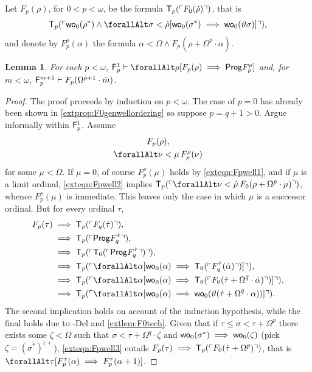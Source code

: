 \documentclass[UKenglish,cleveref,DIV=12]{scrartcl}
\let\forall\forallAlt
\newtheorem{lemma}{Lemma}
\theoremstyle{definition}
\theoremstyle{definition}
\begin{document}
Let $F_p(\rho)$, for $0<p<\omega$, be the formula $\mathsf{T}_p(\ulcorner{F_0(\dot\rho)}\urcorner)$, that is
\begin{align*}
 \T_{p}(\gn{\wo_0(\rho^*)\land\forall\sigma<\dot\rho [\wo_0(\sigma^*)\implies\wo_0(\vartheta\sigma)]}),
\end{align*}
and denote by $F_p^\rho(\alpha)$ the formula $\alpha<\Omega\land F_p(\rho+\Omega^{\bar p}\cdot\alpha)$.
\begin{lemma}\label{extlem:Fpwellordering1}
 For each $p<\omega$, $\F_p^1\proves \forall\rho[F_p(\rho)\implies\Prog F_p^{\rho}]$ and, for $m<\omega$, $\mathsf{F}_p^{m+1}\vdash F_p(\Omega^{\bar p+1}\cdot\bar m)$.
\end{lemma}
\begin{proof} The proof proceeds by induction on $p<\omega$. The case of $p=0$
has already been shown in \cref{extprop:F0genwellordering} so suppose $p=q+1>0$.
Argue informally within $\mathsf{F}_p^1$. Assume
\begin{gather}
 F_p(\rho),\label{exteqn:Fpwell1}\\
 \forall\nu<\mu\,F_p^\rho(\nu)\label{exteqn:Fpwell2}
\end{gather}
for some $\mu<\Omega$. If $\mu=0$, of course $F_p^\rho(\mu)$ holds by
\cref{exteqn:Fpwell1}, and if $\mu$ is a limit ordinal, \cref{exteqn:Fpwell2}
implies $\T_p(\gn{\forall\nu<\dot\mu\,F_0(\rho+\Omega^{\bar p}\cdot\mu)})$,
whence $F_p^\rho(\mu)$ is immediate. This leaves only the case in which $\mu$ is a
successor ordinal. But for every ordinal $\tau$,
\begin{align}\label{exteqn:Fpwell3}
\begin{split}
  F_p(\tau) &\implies \T_p(\gn{F_q(\dot\tau)}), \\
	  &\implies \T_p(\gn{\Prog F_q^{\dot\tau}}),\\
	  &\implies \T_p(\gn{\T_0(\gn{\Prog F_q^{\dot\tau}})}),\\
	  &\implies \T_p(\gn{\forall\alpha[\wo_0(\alpha)\implies \T_0(\gn{F_q^{\dot\tau}(\dot\alpha)})]}),\\
	  &\implies \T_p(\gn{\forall\alpha[\wo_0(\alpha)\implies \T_0(\gn{F_0(\dot\tau+\Omega^{\bar q}\cdot\dot\alpha)})]}),\\
	  &\implies \T_p(\gn{\forall\alpha[\wo_0(\alpha)\implies\wo_0(\vartheta(\dot\tau+\Omega^{\bar q}\cdot\alpha))]}).
	  \end{split}
\end{align}
The second implication holds on account of the induction hypothesis, while the
final holds due to -Del and \cref{extlem:F0tech}. Given that if
$\tau\le\sigma<\tau+\Omega^{p}$ there exists
some $\zeta<\Omega$ such that $\sigma<\tau+\Omega^q\cdot\zeta$ and
$\mathsf{wo}_0(\sigma^*)\implies\mathsf{wo}_0(\zeta)$ (pick
$\zeta=(\sigma^*)^{\varepsilon+}$), \cref{exteqn:Fpwell3}
entails $F_p(\tau)\implies\mathsf{T}_p(\ulcorner{F_0(\dot\tau+\Omega^{\bar p})}\urcorner)$,
that is $\forall\tau[F_p^\tau(\alpha)\implies F_p^\tau(\alpha+1)]$.


\end{proof}
\end{document}
